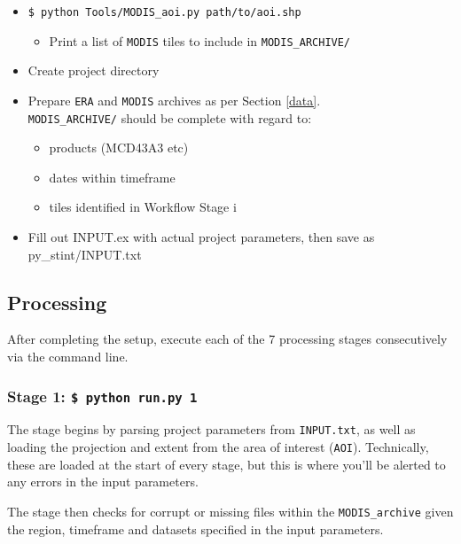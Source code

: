 \documentclass[twoside,a4paper]{refart}
\begin{document}
\begin{itemize}
    \item
        \texttt{\$ python Tools/MODIS\_aoi.py path/to/aoi.shp}
        \begin{itemize}
            \item
                Print a list of \texttt{MODIS} tiles to include in 
                \texttt{MODIS\_ARCHIVE/}
        \end{itemize}
    
    \item
        Create project directory
    \item
        Prepare \texttt{ERA} and \texttt{MODIS} archives 
        as per Section \ref{data}.  \\
        \texttt{MODIS\_ARCHIVE/} should be complete
        with regard to:
        \begin{itemize}
        \item
            products (MCD43A3 etc)
        \item
            dates within timeframe
        \item
            tiles identified in Workflow Stage i
        \end{itemize}
    \item
        Fill out INPUT.ex with actual project parameters, 
        then save as py\_stint/INPUT.txt
\end{itemize}


\subsection{Processing}
\label{stages}
After completing the setup, execute each of the 7 processing stages 
consecutively via the command line.

\subsubsection{\textbf{Stage 1:} \texttt{\$ python run.py 1}}
The stage begins by parsing project parameters from \texttt{INPUT.txt}, 
as well as loading the projection and extent from the area of interest 
(\texttt{AOI}). Technically, these are loaded at the start of every stage, 
but this is where you'll be alerted to any errors in the input parameters.

The stage then checks for corrupt or missing files within the 
\texttt{MODIS\_archive} given the region, timeframe and datasets 
specified in the input parameters.
\end{document}
